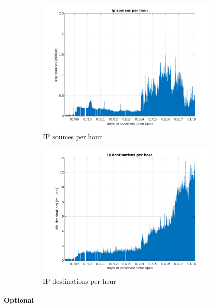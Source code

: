\documentclass{article}
\begin{document}
\begin{figure}[H]
\begin{subfigure}{.5\textwidth}
        \includegraphics[width=\textwidth]{../exercise-3/plots/rep_10_3}
        \caption{IP sources per hour}
    \end{subfigure}
    \begin{subfigure}{.5\textwidth}
        \centering
        \includegraphics[width=\textwidth]{../exercise-3/plots/rep_10_4}
        \caption{IP destinations per hour}
    \end{subfigure}
    \caption{\label{figure:rep-10}}
\end{figure}

\paragraph{Optional}
\end{document}
